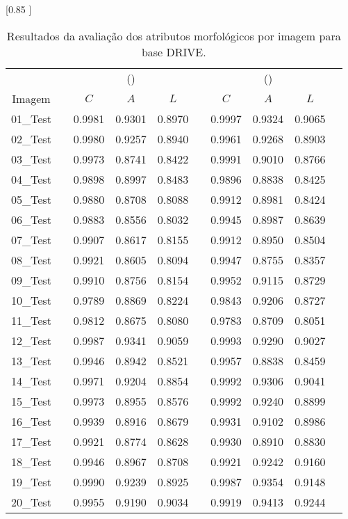 \begin{table}[h!] 
\caption{Resultados da avalia\c{c}\~{a}o dos atributos morfol\'ogicos por imagem para base DRIVE.} 
\label{tabAllQualDRIVE} 
\centering 
\scalebox {0.85 }[0.85 ]{  
\begin{tabular}{cccccccccc}  
\toprule  
&  & \multicolumn{3}{c}{\citeauthor{Zana:2001} (\citeyear{Zana:2001})} &  & \multicolumn{3}{c}{\citeauthor{Soares:2006} (\citeyear{Soares:2006})} \\  
\cmidrule{3-5} \cmidrule{7-9}  
Imagem &  & $C$ & $A$ & $L$ & & $C$ & $A$ & $L$ \\  
\midrule  
01\_Test &  & 0.9981 & 0.9301 & 0.8970 & & 0.9997 & 0.9324 & 0.9065  \\  
02\_Test &  & 0.9980 & 0.9257 & 0.8940 & & 0.9961 & 0.9268 & 0.8903  \\  
03\_Test &  & 0.9973 & 0.8741 & 0.8422 & & 0.9991 & 0.9010 & 0.8766  \\  
04\_Test &  & 0.9898 & 0.8997 & 0.8483 & & 0.9896 & 0.8838 & 0.8425  \\  
05\_Test &  & 0.9880 & 0.8708 & 0.8088 & & 0.9912 & 0.8981 & 0.8424  \\  
06\_Test &  & 0.9883 & 0.8556 & 0.8032 & & 0.9945 & 0.8987 & 0.8639  \\  
07\_Test &  & 0.9907 & 0.8617 & 0.8155 & & 0.9912 & 0.8950 & 0.8504  \\  
08\_Test &  & 0.9921 & 0.8605 & 0.8094 & & 0.9947 & 0.8755 & 0.8357  \\  
09\_Test &  & 0.9910 & 0.8756 & 0.8154 & & 0.9952 & 0.9115 & 0.8729  \\  
10\_Test &  & 0.9789 & 0.8869 & 0.8224 & & 0.9843 & 0.9206 & 0.8727  \\  
11\_Test &  & 0.9812 & 0.8675 & 0.8080 & & 0.9783 & 0.8709 & 0.8051  \\  
12\_Test &  & 0.9987 & 0.9341 & 0.9059 & & 0.9993 & 0.9290 & 0.9027  \\  
13\_Test &  & 0.9946 & 0.8942 & 0.8521 & & 0.9957 & 0.8838 & 0.8459  \\  
14\_Test &  & 0.9971 & 0.9204 & 0.8854 & & 0.9992 & 0.9306 & 0.9041  \\  
15\_Test &  & 0.9973 & 0.8955 & 0.8576 & & 0.9992 & 0.9240 & 0.8899  \\  
16\_Test &  & 0.9939 & 0.8916 & 0.8679 & & 0.9931 & 0.9102 & 0.8986  \\  
17\_Test &  & 0.9921 & 0.8774 & 0.8628 & & 0.9930 & 0.8910 & 0.8830  \\  
18\_Test &  & 0.9946 & 0.8967 & 0.8708 & & 0.9921 & 0.9242 & 0.9160  \\  
19\_Test &  & 0.9990 & 0.9239 & 0.8925 & & 0.9987 & 0.9354 & 0.9148  \\  
20\_Test &  & 0.9955 & 0.9190 & 0.9034 & & 0.9919 & 0.9413 & 0.9244  \\  
\bottomrule  
\end{tabular}  
}  
\end{table}  
 

